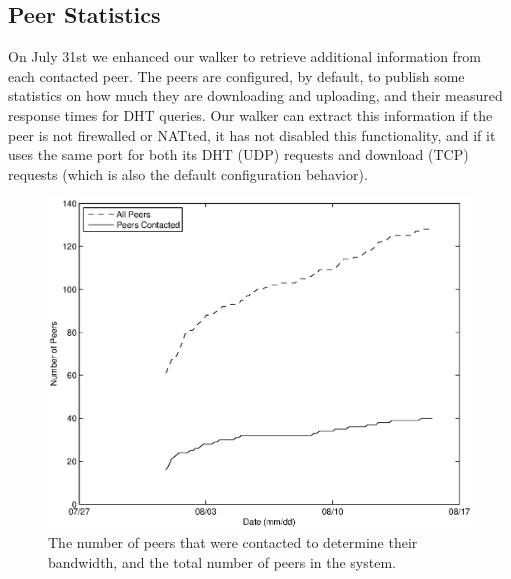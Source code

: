 \documentclass[conference]{IEEEtran}
\begin{document}
%

\subsection{Peer Statistics}
\label{peer_stats}

On July 31st we enhanced our walker to retrieve additional
information from each contacted peer. The peers are configured, by
default, to publish some statistics on how much they are downloading
and uploading, and their measured response times for DHT queries.
Our walker can extract this information if the peer is not
firewalled or NATted, it has not disabled this functionality, and if
it uses the same port for both its DHT (UDP) requests and download
(TCP) requests (which is also the default configuration behavior).

\begin{figure}
\centering
\includegraphics[width=0.80\columnwidth]{AptP2PDownloaded-peers.eps}
\caption{The number of peers that were contacted to determine their
bandwidth, and the total number of peers in the system.}
\label{down_peers}
\end{figure}
\end{document}

